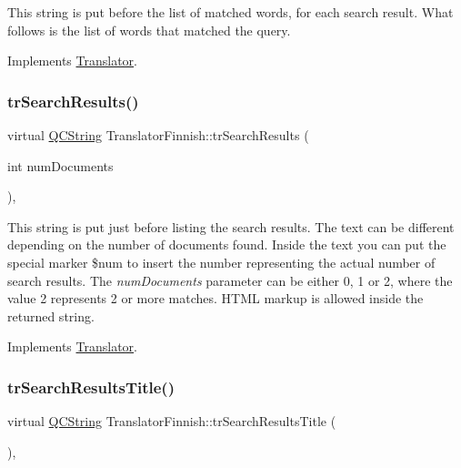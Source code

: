 This string is put before the list of matched words, for each search result. What follows is the list of words that matched the query. 

Implements \mbox{\hyperlink{class_translator}{Translator}}.

\mbox{\label{class_translator_finnish_af3abcf73577c64cee842160450ecf2f2}} 
\subsubsection{\texorpdfstring{trSearchResults()}{trSearchResults()}}
{\footnotesize\ttfamily virtual \mbox{\hyperlink{class_q_c_string}{Q\+C\+String}} Translator\+Finnish\+::tr\+Search\+Results (\begin{DoxyParamCaption}\item[{int}]{num\+Documents }\end{DoxyParamCaption})\hspace{0.3cm}{\ttfamily [inline]}, {\ttfamily [virtual]}}

This string is put just before listing the search results. The text can be different depending on the number of documents found. Inside the text you can put the special marker \$num to insert the number representing the actual number of search results. The {\itshape num\+Documents} parameter can be either 0, 1 or 2, where the value 2 represents 2 or more matches. H\+T\+ML markup is allowed inside the returned string. 

Implements \mbox{\hyperlink{class_translator}{Translator}}.

\mbox{\label{class_translator_finnish_a6ef63ac25a652a679d1c30e2735633b2}} 
\subsubsection{\texorpdfstring{trSearchResultsTitle()}{trSearchResultsTitle()}}
{\footnotesize\ttfamily virtual \mbox{\hyperlink{class_q_c_string}{Q\+C\+String}} Translator\+Finnish\+::tr\+Search\+Results\+Title (\begin{DoxyParamCaption}{ }\end{DoxyParamCaption})\hspace{0.3cm}{\ttfamily [inline]}, {\ttfamily [virtual]}}


